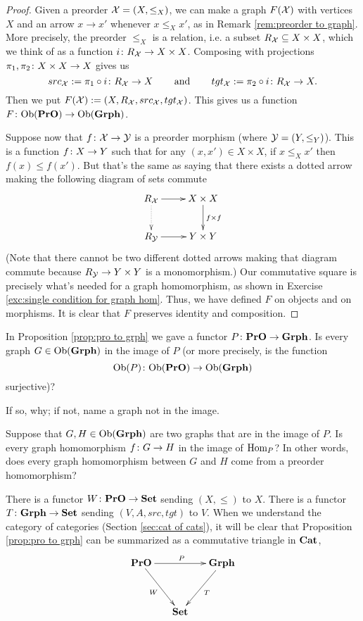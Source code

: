 \begin{proof}

Given a preorder $\mathcal{X}=(X,\leq_X)$, we can make a graph $F(\mathcal{X})$ with vertices $X$ and an arrow $x\to x'$ whenever $x\leq_X x'$, as in Remark \ref{rem:preorder to graph}. More precisely, the preorder $\leq_X$ is a relation, i.e. a subset $R_\mathcal{X}\subseteq X\times X$, which we think of as a function $i\colon R_\mathcal{X}\rightarrow X\times X$. Composing with projections $\pi_1,\pi_2\colon X\times X\rightarrow X$ gives us $$src_\mathcal{X}:=\pi_1\circ i\colon R_\mathcal{X}\rightarrow X\hspace{.3in}\textnormal{and}\hspace{.3in} tgt_\mathcal{X}:=\pi_2\circ i\colon R_\mathcal{X}\rightarrow X.$$ Then we put $F(\mathcal{X}):=(X,R_\mathcal{X},src_\mathcal{X},tgt_\mathcal{X})$. This gives us a function $F\colon\textnormal{Ob}({\bf PrO})\rightarrow\textnormal{Ob}({\bf Grph})$.

Suppose now that $f\colon\mathcal{X}\rightarrow\mathcal{Y}$ is a preorder morphism (where $\mathcal{Y}=(Y,\leq_Y)$). This is a function $f\colon X\rightarrow Y$ such that for any $(x,x')\in X\times X$, if $x\leq_X x'$ then $f(x)\leq f(x')$. But that's the same as saying that there exists a dotted arrow making the following diagram of sets commute
$$
\xymatrix{R_\mcX\ar[r]\ar@{..>}[d]&X\times X\ar[d]^{f\times f}\\R_\mcY\ar[r]&Y\times Y
}
$$
(Note that there cannot be two different dotted arrows making that diagram commute because $R_\mathcal{Y}\rightarrow Y\times Y$ is a monomorphism.) 
Our commutative square is precisely what's needed for a graph homomorphism, as shown in Exercise \ref{exc:single condition for graph hom}. Thus, we have defined $F$ on objects and on morphisms. It is clear that $F$ preserves identity and composition.

\end{proof}

\begin{exercise}
In Proposition \ref{prop:pro to grph} we gave a functor $P\colon{\bf PrO}\rightarrow{\bf Grph}$.
\sexc  Is every graph $G\in\textnormal{Ob}({\bf Grph})$ in the image of $P$ (or more precisely, is the function $$\textnormal{Ob}(P)\colon\textnormal{Ob}({\bf PrO})\rightarrow\textnormal{Ob}({\bf Grph})$$ surjective)?
\item If so, why; if not, name a graph not in the image.
\item Suppose that $G, H\in\textnormal{Ob}({\bf Grph})$ are two graphs that are in the image of $P$. Is every graph homomorphism $f\colon G\rightarrow H$ in the image of $\textnormal{Hom}_P$? In other words, does every graph homomorphism between $G$ and $H$ come from a preorder homomorphism?
\endsexc
\end{exercise}

\begin{remark}

There is a functor $W\colon{\bf PrO}\rightarrow{\bf Set}$ sending $(X,\leq)$ to $X$. There is a functor $T\colon{\bf Grph}\rightarrow{\bf Set}$ sending $(V,A,src,tgt)$ to $V$. When we understand the category of categories (Section \ref{sec:cat of cats}), it will be clear that Proposition \ref{prop:pro to grph} can be summarized as a commutative triangle in ${\bf Cat}$, 
$$
\xymatrix@=15pt{\PrO\ar[rr]^P\ar[ddr]_W&&\Grph\ar[ddl]^T\\\\&\Set}
$$

\end{remark}

